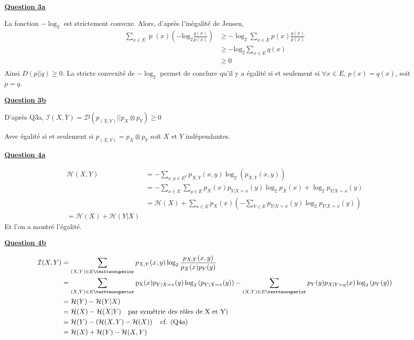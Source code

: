 \documentclass[a4paper,twoside,10pt]{article}
\renewcommand{\H}{\mathcal{H}}
\newcommand{\I}{\mathcal{I}}
\newcommand{\D}{\mathcal{D}}
\newenvironment{Q}[1]{%
\vspace{1ex}
\underline{\textbf{Question #1\\}}
\newline
}{
\vspace{2ex}
}
\begin{document}
\begin{Q}{3a}
La fonction $- \log_2$ est strictement convexe. Alors, d'après l'inégalité de Jensen,
\begin{align*}
\sum_{x \in E} \operatorname{p}(x) \left(
	- \operatorname{log_2}\frac{q(x)}{p(x)}
	\right) &\geq 
		-\log_2{\sum_{x \in E} p(x) \frac{q(x)}{p(x)}} \\
&\geq -\operatorname{log_2} \sum_{x \in E}q(x) \\
&\geq 0 \\
\end{align*}
Ainsi $D(p||q) \geq 0$.
La stricte convexité de $-\log_2$ permet de conclure qu'il y a égalité si et seulement si $\forall x \in E$, $p(x) = q(x)$, soit $p=q$. 
\end{Q}

\begin{Q}{3b}

D'après Q3a, $\I(X,Y) = \D(p_{(X,Y)} || p_X \otimes p_Y) \geq 0$

Avec égalité si et seulement si $p_{(X,Y)} = p_X \otimes p_Y$ soit $X$ et $Y$ indépendantes.
\end{Q}

\begin{Q}{4a}
\begin{align*}
 \H(X,Y) &= - \sum_{x,y \in E^2}  p_{X,Y}(x,y)\log_2{(p_{X,Y}(x,y))} \\
	&= -\sum_{x \in E} \sum_{y \in E} p_X(x) p_{Y|X = x}(y) \log_2{p_X(x)}
		+ \log_2{p_{Y|X= x}(y)} \\
	&= \H(X) + \sum_{x \in E} p_X(x)
		\left(
			-\sum_{Y \in E} p_{Y|X = x}(y) \log_2{p_{Y|X = x}(y)}
		\right) \\
 = \H(X) + \H(Y|X)
\end{align*}
Et l'on a montré l'égalité.
\end{Q} 
 
\begin{Q}{4b}

\begin{align*}
 \I(X,Y) &= \sum_{(X,Y) \in E²} p_{X,Y}(x,y)
				\log_2{\frac{p_{X,Y}{(x,y)}}{p_X(x)p_Y(y)}} \\
	&= \sum_{(X,Y) \in E²}
		\operatorname{p_X}(x) p_{Y|X=x}(y) \log_2{(p_{Y|X=x}(y))} 
 		- \sum_{(X,Y) \in E²}
 			p_Y(y) p_{X|Y=y}(x) \log_2{(p_{Y}(y))} \\
	&= \H(Y) - \H(Y|X) \\
	&= \H(X) - \H(X|Y) \text{\quad par symétrie des rôles de X et Y)} \\
	&= \H(Y) - \left(\H(X,Y) - \H(X)\right) \text{\quad cf. (Q4a)} \\
	&= \H(X) + \H(Y) - \H(X,Y)
\end{align*}
\end{Q}
\end{document}

